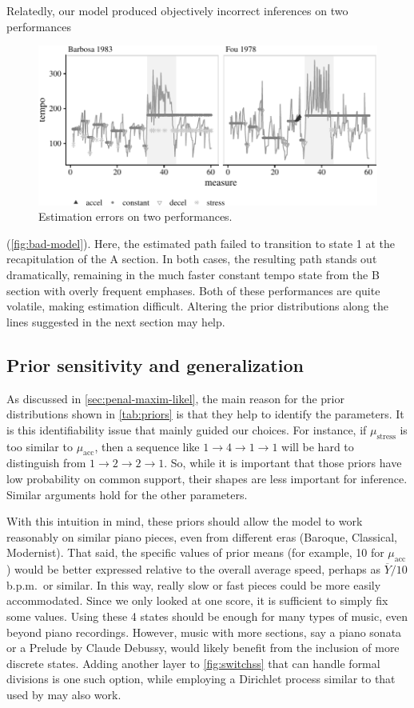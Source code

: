 \documentclass[aoas]{imsart}
\begin{document}
Relatedly,
our model produced objectively incorrect inferences on two performances
\begin{figure}[t]
  \centering
  \includegraphics[width=.9\linewidth]{bad-model-1}
  \caption{Estimation errors on two performances.}
  \label{fig:bad-model}
\end{figure}
(\autoref{fig:bad-model}). Here, the estimated
path failed to transition to state 1 at the
recapitulation of the A section. In both cases, the resulting path
stands out dramatically, remaining in the much faster constant tempo
state from the B section with overly frequent emphases. Both of these
performances are quite volatile, making estimation difficult. Altering
the prior distributions along the lines suggested in the next section
may help.



\subsection{Prior sensitivity and generalization}
\label{sec:prior-sens-gener}

As discussed in \autoref{sec:penal-maxim-likel}, the main reason for the prior distributions shown in
\autoref{tab:priors} is that they help to identify the
parameters. It is this identifiability issue that mainly guided our
choices. For instance, if $\mu_{\textrm{stress}}$ is too similar to
$\mu_{\textrm{acc}}$, then a sequence like $1\rightarrow 4 \rightarrow
1 \rightarrow 1$ will be hard to distinguish from $1\rightarrow 2
\rightarrow 2 \rightarrow 1$. So, while it is important that those
priors have low probability on common support, their shapes are less important for
inference. Similar arguments hold for the other parameters.

With this intuition in mind, these priors should allow the model to
work reasonably on similar piano pieces, even from different eras
(Baroque, Classical, Modernist). That said, the specific
values of prior means (for example, 10 for $\mu_{\mbox{acc}}$)
would be better expressed relative to the overall average speed,
perhaps as $\overline{Y}/10$ b.p.m.\ or similar. In this way, really
slow or fast pieces could be more easily accommodated. Since we only looked at one
score, it is sufficient to simply fix some values. Using these 4
states should be enough for many types of music, even beyond piano
recordings. However, music with more
sections, say a piano sonata or a Prelude by Claude Debussy, would
likely benefit from the inclusion of more discrete states. Adding
another layer to \autoref{fig:switchss} that can handle formal
divisions is one such option, while employing a Dirichlet process
similar to that used by \citet{RenDunson2010} may also work.
\end{document}
